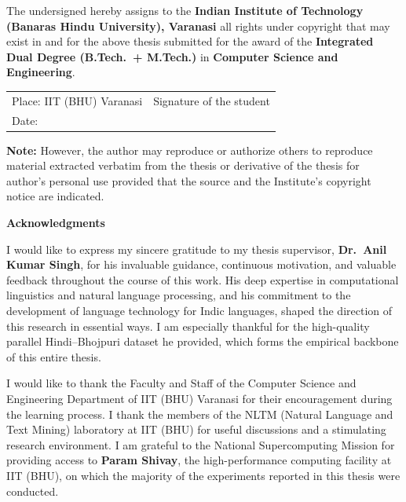 \documentclass[12pt,a4paper,oneside]{report}
\begin{document}
\noindent The undersigned hereby assigns to the \textbf{Indian Institute of Technology
(Banaras Hindu University), Varanasi} all rights under copyright that may exist in
and for the above thesis submitted for the award of the \textbf{Integrated Dual Degree
(B.Tech.\ + M.Tech.)} in \textbf{Computer Science and Engineering}.

\vspace{2cm}
\begin{tabular}{@{}p{6cm}p{6cm}@{}}
Place: IIT (BHU) Varanasi & Signature of the student \\
Date: & \\
\end{tabular}

\vspace{1cm}
\noindent\textbf{Note:} However, the author may reproduce or authorize others to reproduce
material extracted verbatim from the thesis or derivative of the thesis for author's
personal use provided that the source and the Institute's copyright notice are indicated.

\newpage
\thispagestyle{plain}
\begin{center}
{\Large \textbf{Acknowledgments}}
\end{center}
\vspace{0.8cm}

\noindent I would like to express my sincere gratitude to my thesis supervisor,
\textbf{Dr.\ Anil Kumar Singh}, for his invaluable guidance, continuous motivation,
and valuable feedback throughout the course of this work. His deep expertise in
computational linguistics and natural language processing, and his commitment to the
development of language technology for Indic languages, shaped the direction of this
research in essential ways. I am especially thankful for the high-quality parallel
Hindi--Bhojpuri dataset he provided, which forms the empirical backbone of this
entire thesis.

\vspace{0.5cm}
\noindent I would like to thank the Faculty and Staff of the Computer Science and
Engineering Department of IIT (BHU) Varanasi for their encouragement during the
learning process. I thank the members of the NLTM (Natural Language and Text Mining)
laboratory at IIT (BHU) for useful discussions and a stimulating research environment.
I am grateful to the National Supercomputing Mission for providing access to
\textbf{Param Shivay}, the high-performance computing facility at IIT (BHU), on
which the majority of the experiments reported in this thesis were conducted.
\end{document}
